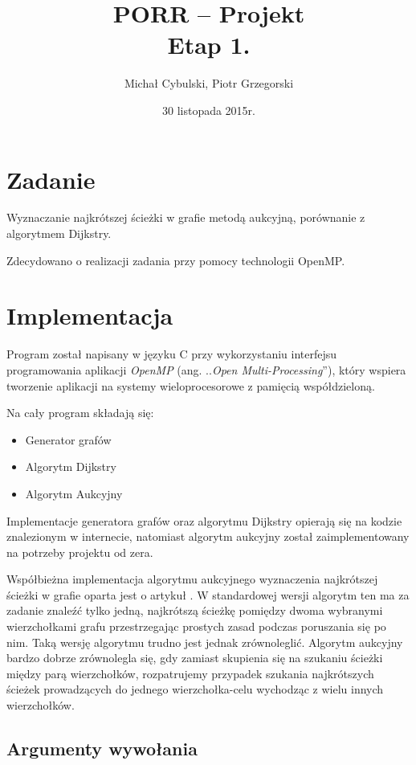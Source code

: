 \documentclass {article}
\author {Michał Cybulski, Piotr Grzegorski}
\title {PORR -- Projekt\\Etap 1.}
\date {30 listopada 2015r.}
\begin{document}
\maketitle

\section {Zadanie}

Wyznaczanie najkrótszej ścieżki w grafie metodą aukcyjną, porównanie z algorytmem Dijkstry.

Zdecydowano o realizacji zadania przy pomocy technologii OpenMP.

\section{Implementacja}

Program został napisany w języku C przy wykorzystaniu interfejsu programowania aplikacji \emph{OpenMP} (ang. ..\emph{Open Multi-Processing}''), który wspiera tworzenie aplikacji na systemy wieloprocesorowe z pamięcią współdzieloną.

Na cały program składają się:
\begin{itemize}
    \item Generator grafów
    \item Algorytm Dijkstry
    \item Algorytm Aukcyjny
\end{itemize}

Implementacje generatora grafów oraz algorytmu Dijkstry opierają się na kodzie znalezionym w internecie, natomiast algorytm aukcyjny został zaimplementowany na potrzeby projektu od zera. 

Współbieżna implementacja algorytmu aukcyjnego wyznaczenia najkrótszej ścieżki w grafie oparta jest o artykuł \cite{Bertsekas1991}. W standardowej wersji algorytm ten ma za zadanie znaleźć tylko jedną, najkrótszą ścieżkę pomiędzy dwoma wybranymi wierzchołkami grafu przestrzegając prostych zasad podczas poruszania się po nim. Taką wersję algorytmu trudno jest jednak zrównoleglić. Algorytm aukcyjny bardzo dobrze zrównolegla się, gdy zamiast skupienia się na szukaniu ścieżki między parą wierzchołków, rozpatrujemy przypadek szukania najkrótszych ścieżek prowadzących do jednego wierzchołka-celu wychodząc z wielu innych wierzchołków.

\subsection{Argumenty wywołania}
\end{document}
